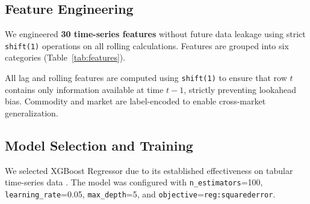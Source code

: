\documentclass[conference]{IEEEtran}
\begin{document}
\subsection{Feature Engineering}
We engineered \textbf{30 time-series features} without future data leakage using strict \texttt{shift(1)} operations on all rolling calculations. Features are grouped into six categories (Table~\ref{tab:features}).

\begin{table}[htbp]
\caption{Engineered Feature Groups for XGBoost Price Prediction}
\label{tab:features}
\centering
{}
\end{table}

All lag and rolling features are computed using \texttt{shift(1)} to ensure that row $t$ contains only information available at time $t{-}1$, strictly preventing lookahead bias. Commodity and market are label-encoded to enable cross-market generalization.

\subsection{Model Selection and Training}
We selected XGBoost Regressor \cite{chen2016xgboost} due to its established effectiveness on tabular time-series data \cite{xiong2020price}. The model was configured with \texttt{n\_estimators}=100, \texttt{learning\_rate}=0.05, \texttt{max\_depth}=5, and \texttt{objective}=\texttt{reg:squarederror}.
\end{document}
